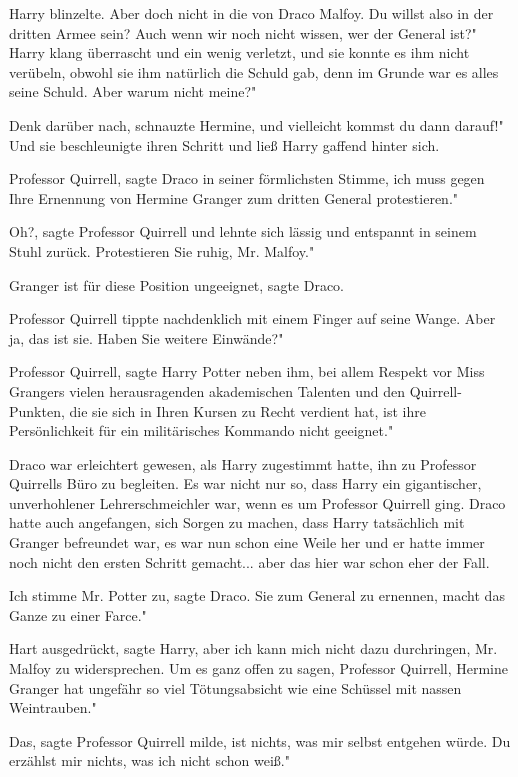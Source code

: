 Harry blinzelte. \glqq Aber doch nicht in die von Draco Malfoy. Du willst also
in der dritten Armee sein? Auch wenn wir noch nicht wissen, wer der General
ist?" Harry klang überrascht und ein wenig verletzt, und sie konnte es ihm nicht
verübeln, obwohl sie ihm natürlich die Schuld gab, denn im Grunde war es alles
seine Schuld. \glqq Aber warum nicht meine?"

\glqq Denk darüber nach\grqq{}, schnauzte Hermine, \glqq und vielleicht kommst
du dann darauf!" Und sie beschleunigte ihren Schritt und ließ Harry gaffend
hinter sich.


\glqq Professor Quirrell\grqq{}, sagte Draco in seiner förmlichsten Stimme,
\glqq ich muss gegen Ihre Ernennung von Hermine Granger zum dritten General
protestieren."

\glqq Oh?\grqq{}, sagte Professor Quirrell und lehnte sich lässig und entspannt
in seinem Stuhl zurück. \glqq Protestieren Sie ruhig, Mr. Malfoy."

\glqq Granger ist für diese Position ungeeignet\grqq{}, sagte Draco.

Professor Quirrell tippte nachdenklich mit einem Finger auf seine Wange. \glqq
Aber ja, das ist sie. Haben Sie weitere Einwände?"

\glqq Professor Quirrell\grqq{}, sagte Harry Potter neben ihm, \glqq bei allem
Respekt vor Miss Grangers vielen herausragenden akademischen Talenten und den
Quirrell-Punkten, die sie sich in Ihren Kursen zu Recht verdient hat, ist ihre
Persönlichkeit für ein militärisches Kommando nicht geeignet."

Draco war erleichtert gewesen, als Harry zugestimmt hatte, ihn zu Professor
Quirrells Büro zu begleiten. Es war nicht nur so, dass Harry ein gigantischer,
unverhohlener Lehrerschmeichler war, wenn es um Professor Quirrell ging. Draco
hatte auch angefangen, sich Sorgen zu machen, dass Harry tatsächlich mit Granger
befreundet war, es war nun schon eine Weile her und er hatte immer noch nicht
den ersten Schritt gemacht... aber das hier war schon eher der Fall.

\glqq Ich stimme Mr. Potter zu\grqq{}, sagte Draco. \glqq Sie zum General zu
ernennen, macht das Ganze zu einer Farce."

\glqq Hart ausgedrückt\grqq{}, sagte Harry, \glqq aber ich kann mich nicht dazu
durchringen, Mr. Malfoy zu widersprechen. Um es ganz offen zu sagen, Professor
Quirrell, Hermine Granger hat ungefähr so viel Tötungsabsicht wie eine Schüssel
mit nassen Weintrauben."

\glqq Das\grqq{}, sagte Professor Quirrell milde, \glqq ist nichts, was mir
selbst entgehen würde. Du erzählst mir nichts, was ich nicht schon weiß."

